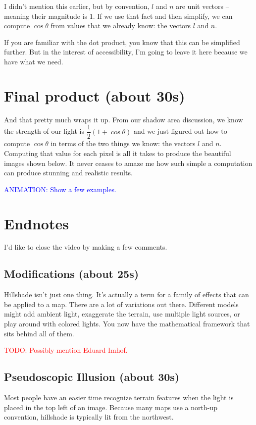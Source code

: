 \documentclass{article}
\newcommand\todo[1]{\textcolor{red}{TODO: #1}}
\newcommand\animation[1]{\textcolor{blue}{ANIMATION: #1}}
\begin{document}
I didn't mention this earlier, but by convention, $l$ and $n$ are unit vectors -- meaning their magnitude is 1.
If we use that fact and then simplify, we can compute $\cos \theta$ from values that we already know: the vectors $l$ and $n$.

If you are familiar with the dot product, you know that this can be simplified further.
But in the interest of accessibility, I'm going to leave it here because we have what we need.

\section{Final product (about 30s)}

And that pretty much wraps it up.
From our shadow area discussion, we know the strength of our light is $\dfrac{1}{2}(1 + \cos \theta)$ and we just figured out how to compute $\cos \theta$ in terms of the two things we know: the vectors $l$ and $n$.
Computing that value for each pixel is all it takes to produce the beautiful images shown below.
It never ceases to amaze me how such simple a computation can produce stunning and realistic results.

\animation{Show a few examples.}

\section{Endnotes}

I'd like to close the video by making a few comments.

\subsection{Modifications (about 25s)}

Hillshade isn't just one thing.
It's actually a term for a family of effects that can be applied to a map.
There are a lot of variations out there.
Different models might add ambient light, exaggerate the terrain, use multiple light sources, or play around with colored lights.
You now have the mathematical framework that sits behind all of them.

\todo{Possibly mention Eduard Imhof.}

\subsection{Pseudoscopic Illusion (about 30s)}

Most people have an easier time recognize terrain features when the light is placed in the top left of an image.
Because many maps use a north-up convention, hillshade is typically lit from the northwest.
\end{document}
